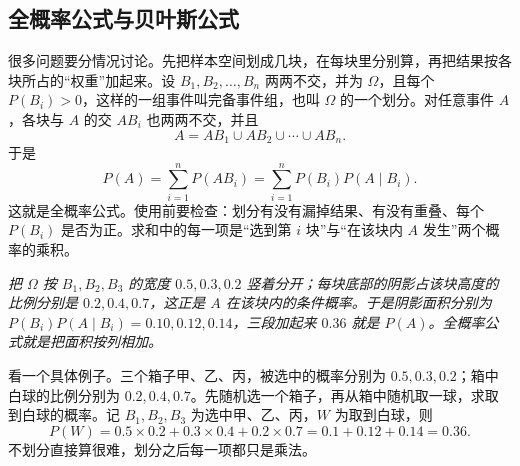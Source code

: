 \subsection{全概率公式与贝叶斯公式}

很多问题要分情况讨论。先把样本空间划成几块，在每块里分别算，再把结果按各块所占的“权重”加起来。设 $B_1,B_2,\dots,B_n$ 两两不交，并为 $\Omega$，且每个 $P(B_i)>0$，这样的一组事件叫完备事件组，也叫 $\Omega$ 的一个划分。对任意事件 $A$，各块与 $A$ 的交 $AB_i$ 也两两不交，并且
\[
A=AB_1\cup AB_2\cup\cdots\cup AB_n .
\]
于是
\[
P(A)=\sum_{i=1}^{n}P(AB_i)=\sum_{i=1}^{n}P(B_i)P(A\mid B_i).
\]
这就是全概率公式。使用前要检查：划分有没有漏掉结果、有没有重叠、每个 $P(B_i)$ 是否为正。求和中的每一项是“选到第 $i$ 块”与“在该块内 $A$ 发生”两个概率的乘积。

\begin{center}
\par\vspace{2pt}
{\footnotesize\itshape 把 $\Omega$ 按 $B_1,B_2,B_3$ 的宽度 $0.5,0.3,0.2$ 竖着分开；每块底部的阴影占该块高度的比例分别是 $0.2,0.4,0.7$，这正是 $A$ 在该块内的条件概率。于是阴影面积分别为 $P(B_i)P(A\mid B_i)=0.10,0.12,0.14$，三段加起来 $0.36$ 就是 $P(A)$。全概率公式就是把面积按列相加。}
\end{center}

看一个具体例子。三个箱子甲、乙、丙，被选中的概率分别为 $0.5,0.3,0.2$；箱中白球的比例分别为 $0.2,0.4,0.7$。先随机选一个箱子，再从箱中随机取一球，求取到白球的概率。记 $B_1,B_2,B_3$ 为选中甲、乙、丙，$W$ 为取到白球，则
\[
P(W)=0.5\times0.2+0.3\times0.4+0.2\times0.7=0.1+0.12+0.14=0.36 .
\]
不划分直接算很难，划分之后每一项都只是乘法。

